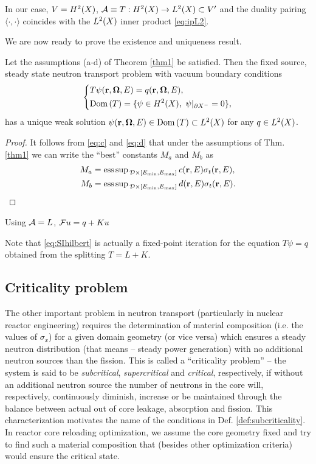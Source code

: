 {In our case, $V = \Hp[2](X)$, $\genop{A} \equiv T : \Hp[2](X) \to \Lp[2](X) \subset V'$ and the duality pairing
$\langle \cdot,\cdot\rangle$ coincides with the $\Lp[2](X)$ inner product \eqref{eq:ipL2}.


We are now ready to prove the existence and uniqueness result.
\begin{theorem}
	Let the assumptions (a-d) of Theorem \ref{thm1} be satisfied.
	Then the fixed source, steady state neutron transport problem with vacuum boundary conditions 
\begin{equation*}
  \left\{
  \begin{aligned}
     &T\psi(\br,\bomega,E) = q(\br,\bomega,E),\\
     &\Dom{T} = \{\psi\in \Hp[2](X),\ \psi\vert_{\pX[-]} = 0\},
  \end{aligned}
  \right.
\end{equation*}
has a unique weak solution $\psi(\br,\bomega,E)\in\Dom{T}\subset\Lp[2](X)$ for any $q\in \Lp[2](X)$.
\end{theorem}
\begin{proof}
	It follows from \eqref{eq:c} and \eqref{eq:d} that under the assumptions of Thm. \ref{thm1} we can write the ``best''
	constants $M_a$ and $M_b$ as 
	$$
	\begin{aligned}
		M_a &= \esssup_{\VV\times[\Emin,\Emax]} c(\br,E)\sigma_t(\br,E), \\
		M_b &= \esssup_{\VV\times[\Emin,\Emax]}	d(\br,E)\sigma_t(\br,E). 
	\end{aligned}
	$$
\end{proof}

Using $\genop{A} = L$,
$\genop{F}u = q + Ku$

Note that \eqref{eq:SIhilbert} is actually a fixed-point iteration for the equation $T\psi = q$ obtained from the
splitting $T = L + K$.
}
\subsection{Criticality problem}\label{sec:criticality}

The other important problem in neutron transport (particularly in nuclear reactor engineering) requires the
determination of material composition (i.e. the values of $\sigma_x$) for a given domain geometry (or vice versa)
which ensures a steady neutron distribution (that means -- steady power generation) with no additional neutron sources
than the fission. This is called a ``criticality problem'' -- the system is said to be \textit{subcritical},
\textit{supercritical} and \textit{critical}, respectively, if without an additional neutron source the number of
neutrons in the core will, respectively, continuously diminish, increase or be maintained through the
balance between actual out of core leakage, absorption and fission. This characterization motivates the name of the
conditions in Def. \ref{def:subcriticality}. In reactor core reloading optimization, we assume the core geometry fixed
and try to find such a material composition that (besides other optimization criteria) would ensure the critical state. 

